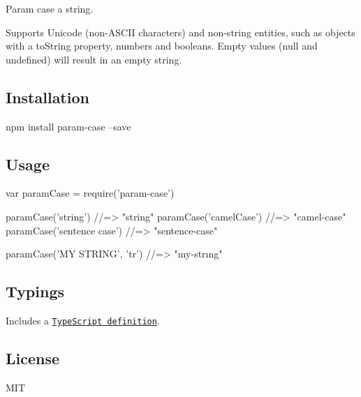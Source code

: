 \href{https://npmjs.org/package/param-case}{\tt } \href{https://npmjs.org/package/param-case}{\tt } \href{https://travis-ci.org/blakeembrey/param-case}{\tt } \href{https://coveralls.io/r/blakeembrey/param-case?branch=master}{\tt }

Param case a string.

Supports Unicode (non-\/\+A\+S\+C\+II characters) and non-\/string entities, such as objects with a {\ttfamily to\+String} property, numbers and booleans. Empty values ({\ttfamily null} and {\ttfamily undefined}) will result in an empty string.

\subsection*{Installation}


\begin{DoxyCode}
npm install param-case --save
\end{DoxyCode}


\subsection*{Usage}


\begin{DoxyCode}
var paramCase = require('param-case')

paramCase('string')        //=> "string"
paramCase('camelCase')     //=> "camel-case"
paramCase('sentence case') //=> "sentence-case"

paramCase('MY STRING', 'tr') //=> "my-strıng"
\end{DoxyCode}


\subsection*{Typings}

Includes a \href{param-case.d.ts}{\tt Type\+Script definition}.

\subsection*{License}

M\+IT 